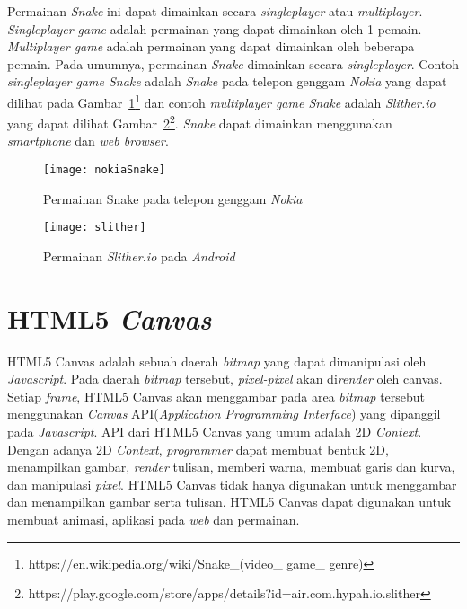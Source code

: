 Permainan \textit{Snake} ini dapat dimainkan secara \textit{singleplayer} atau \textit{multiplayer}. \textit{Singleplayer game} adalah permainan yang dapat dimainkan oleh 1 pemain. \textit{Multiplayer game} adalah permainan yang dapat dimainkan oleh beberapa pemain. Pada umumnya, permainan \textit{Snake} dimainkan secara \textit{singleplayer}. Contoh \textit{singleplayer game Snake} adalah \textit{Snake} pada telepon genggam \textit{Nokia} yang dapat dilihat pada Gambar~\ref{fig:nokiaSnake}\footnote{https://en.wikipedia.org/wiki/Snake\_(video\_ game\_ genre)} dan contoh \textit{multiplayer game Snake} adalah \textit{Slither.io} yang dapat dilihat Gambar~\ref{fig:slither}\footnote{https://play.google.com/store/apps/details?id=air.com.hypah.io.slither}. \textit{Snake} dapat dimainkan menggunakan \textit{smartphone} dan \textit{web browser}.  

\begin{figure}[H]
	\centering  
	\texttt{[image: nokiaSnake]}  
	\caption[Permainan Snake pada telepon genggam \textit{Nokia}]{Permainan Snake pada telepon genggam \textit{Nokia}} 
	\label{fig:nokiaSnake} 
\end{figure} 

\begin{figure}[H]
	\centering  
	\texttt{[image: slither]}  
	\caption[Permainan \textit{Slither.io} pada \textit{Android}]{Permainan \textit{Slither.io} pada \textit{Android}} 
	\label{fig:slither} 
\end{figure} 

\section{HTML5 \textit{Canvas}}
\label{sec:HTML5Canvas}
HTML5 Canvas adalah sebuah daerah \textit{bitmap} yang dapat dimanipulasi oleh \textit{Javascript}. Pada daerah \textit{bitmap} tersebut, \textit{pixel-pixel} akan di\textit{render} oleh canvas. Setiap \textit{frame}, HTML5 Canvas akan menggambar pada area \textit{bitmap} tersebut menggunakan \textit{Canvas} API(\textit{Application Programming Interface}) yang dipanggil pada \textit{Javascript}. API dari HTML5 Canvas yang umum adalah 2D \textit{Context}. Dengan adanya 2D \textit{Context}, \textit{programmer} dapat membuat bentuk 2D, menampilkan gambar, \textit{render} tulisan, memberi warna, membuat garis dan kurva, dan manipulasi \textit{pixel}. HTML5 Canvas tidak hanya digunakan untuk menggambar dan menampilkan gambar serta tulisan. HTML5 Canvas dapat digunakan untuk membuat animasi, aplikasi pada \textit{web} dan permainan. 

